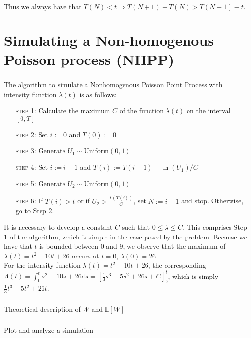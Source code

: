 \documentclass[11pt, oneside]{article}   	%
\begin{document}
Thus we always have that $T(N) < t \Rightarrow T(N + 1) - T(N) > T(N + 1) - t$.
\section{}

\part{Simulating a Non-homogenous Poisson process (NHPP)}
\section{}
The algorithm to simulate a Nonhomogenous Poisson Point Process with intensity function $\lambda(t)$ is as follows:
\begin{enumerate}[leftmargin=30pt,labelindent=65pt,itemindent=30pt]
\item[\textsc{step 1:}] Calculate the maximum $C$ of the function $\lambda(t)$ on the interval $[0,T]$
\item[\textsc{step 2:}] Set $i:=0$ and $T(0):=0$
\item[\textsc{step 3:}] Generate $U_1 \sim \text{Uniform}(0,1)$
\item[\textsc{step 4:}] Set $i := i + 1$ and $T(i) := T(i-1) - \ln(U_1)/C$
\item[\textsc{step 5:}] Generate $U_2 \sim\text{Uniform}(0,1)$
\item[\textsc{step 6:}] If $T(i) > t$ or if $U_2 > \frac{\lambda(T(i))}{C}$, set $N:=i-1$ and stop. Otherwise, go to Step 2.
\end{enumerate}
It is necessary to develop a constant $C$ such that $0\leq{\lambda}\leq{C}$. This comprises Step 1 of the algorithm, which is simple in the case posed by the problem. Because we have that $t$ is bounded between 0 and 9, we observe that the maximum of $\lambda(t) = t^2 - 10t + 26$ occurs at $t=0$, $\lambda(0)=26$.\\

For the intensity function $\lambda(t) = t^2 - 10 t + 26$, the corresponding $\Lambda(t) = \int_{0}^{t} s^2 - 10 s + 26 \mathrm{d}s = \left[ \frac{1}{3}s^3 - 5 s^2 + 26 s + C \right]_{0}^{t}$, which is simply $\frac{1}{3}t^3 - 5 t^2 + 26 t $.

\section{}
Theoretical description of $W$ and $\mathbb{E}[W]$

\section{}
Plot and analyze a simulation
\end{document}
